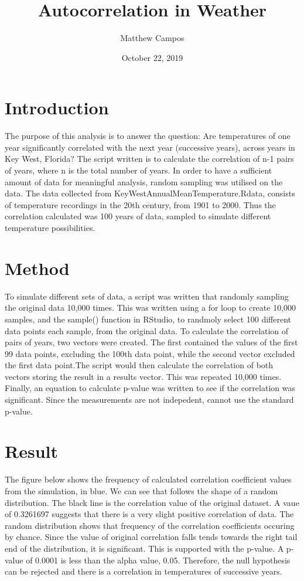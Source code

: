 \documentclass[12pt]{article}
\title{Autocorrelation in Weather}
\author{Matthew Campos}
\date{October 22, 2019}
\begin{document}
    \maketitle

    \section{Introduction}
    The purpose of this analysis is to answer the question:  Are temperatures of one year significantly correlated with the next year (successive years), across years in Key West, Florida? The script written is to calculate the correlation of n-1 pairs of years, where n is the total number of years. In order to have a sufficient amount of data for meaningful analysis, random sampling was utilised on the data. The data collected from KeyWestAnnualMeanTemperature.Rdata, consists of temperature recordings in the 20th century, from 1901 to 2000. Thus the correlation calculated was 100 years of data, sampled to simulate different temperature possibilities.

    \section{Method}
    To simulate different sets of data, a script was written that randomly sampling the original data 10,000 times. This was written using a for loop to create 10,000 samples, and the sample() function in RStudio, to randmoly select 100 different data points each sample, from the original data. To calculate the correlation of pairs of years, two vectors were created. The first contained the values of the first 99 data points, excluding the 100th data point, while the second vector excluded the first data point.The script would then calculate the correlation of both vectors storing the result in a results vector. This was repeated 10,000 times. Finally, an equation to calculate p-value was written to see if the correlation was significant. Since the measurements are not indepedent, cannot use the standard p-value.

    \section{Result}
    The figure below shows the frequency of calculated correlation coefficient values from the simulation, in blue. We can see that follows the shape of a random distribution. The black line is the correlation value of the original dataset. A vaue of 0.3261697 suggests that there is a very slight positive correlation of data. The random distribution shows that frequency of the correlation coefficients occuring by chance. Since the value of original correlation falls tends towards the right tail end of the distribution, it is significant. This is supported with the p-value. A p-value of 0.0001 is less than the alpha value, 0.05. Therefore, the null hypothesis can be rejected and there is a correlation in temperatures of successive years.
\end{document}
